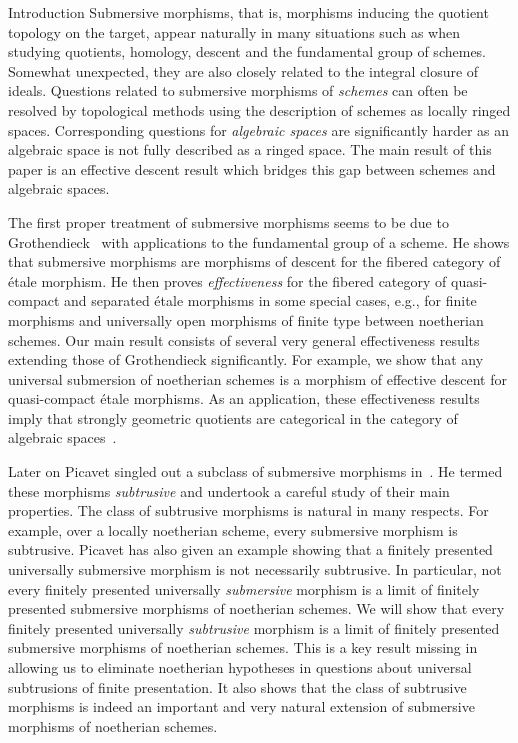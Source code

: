 \documentclass[a4paper,twoside,11pt]{amsart}[2009/07/02] %
\newcommand{\etale}{\'{e}tale}
\begin{document}
\setcounter{secnumdepth}{0}
\begin{section}{Introduction}
Submersive morphisms, that is, morphisms inducing the quotient topology on the
target, appear naturally in many situations such as when studying quotients,
homology, descent and the fundamental group of schemes. Somewhat unexpected,
they are also closely related to the integral closure of ideals. Questions
related to submersive morphisms of \emph{schemes} can often be resolved by
topological methods using the description of schemes as locally ringed spaces.
Corresponding questions for \emph{algebraic spaces} are significantly harder as
an algebraic space is not fully described as a ringed space. The main result of
this paper is an effective descent result which bridges this gap between
schemes and algebraic spaces.

The first proper treatment of submersive morphisms seems to be due to
Grothendieck~\cite[Exp.~IX]{sga1} with applications to the fundamental group of
a scheme. He shows that submersive morphisms are morphisms of descent for the
fibered category of \etale{} morphism. He then proves \emph{effectiveness} for
the fibered category of quasi-compact and separated \etale{} morphisms in some
special cases, e.g., for finite morphisms and universally open morphisms of
finite type between noetherian schemes. Our main result consists of several
very general effectiveness results extending those of Grothendieck
significantly. For example, we show that any universal submersion of
noetherian schemes is a morphism of effective descent for quasi-compact
\etale{} morphisms. As an application, these effectiveness results imply that
strongly geometric quotients are categorical in the category of algebraic
spaces~\cite{rydh_finite_quotients}.

Later on Picavet singled out a subclass of submersive morphisms
in~\cite{picavet_submersion}. He termed these morphisms \emph{subtrusive} and
undertook a careful study of their main properties. The class of subtrusive
morphisms is natural in many respects. For example, over a locally noetherian
scheme, every submersive morphism is subtrusive. Picavet has also given an
example showing that a finitely presented universally submersive morphism is
not necessarily subtrusive. In particular, not every finitely presented
universally \emph{submersive} morphism is a limit of finitely presented
submersive morphisms of noetherian schemes. We will show that every finitely
presented universally \emph{subtrusive} morphism is a limit of finitely
presented submersive morphisms of noetherian schemes. This is a key result
missing in~\cite{picavet_submersion} allowing us to eliminate noetherian
hypotheses in questions about universal subtrusions of finite presentation. It
also shows that the class of subtrusive morphisms is indeed an important and
very natural extension of submersive morphisms of noetherian schemes.


\end{section}
\end{document}
